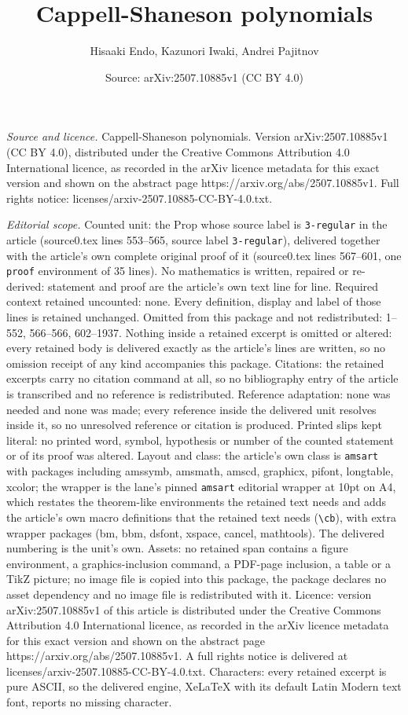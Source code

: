 \documentclass[10pt,a4paper]{amsart}
\title[Cappell-Shaneson polynomials]{Cappell-Shaneson polynomials}
\author{Hisaaki Endo, Kazunori Iwaki, Andrei Pajitnov}
\date{Source: arXiv:2507.10885v1 (CC BY 4.0)}
\begin{document}
\maketitle

\noindent\emph{Source and licence.} Cappell-Shaneson polynomials. Version arXiv:2507.10885v1 (CC BY 4.0), distributed under the Creative Commons Attribution 4.0 International licence, as recorded in the arXiv licence metadata for this exact version and shown on the abstract page https://arxiv.org/abs/2507.10885v1. Full rights notice: licenses/arxiv-2507.10885-CC-BY-4.0.txt.\par\smallskip

\noindent\textit{Editorial scope.} Counted unit: the Prop whose source label is \texttt{3-regular} in the article (source0.tex lines 553--565, source label \texttt{3-regular}), delivered together with the article's own complete original proof of it (source0.tex lines 567--601, one \texttt{proof} environment of 35 lines). No mathematics is written, repaired or re-derived: statement and proof are the article's own text line for line. Required context retained uncounted: none. Every definition, display and label of those lines is retained unchanged. Omitted from this package and not redistributed: 1--552, 566--566, 602--1937. Nothing inside a retained excerpt is omitted or altered: every retained body is delivered exactly as the article's lines are written, so no omission receipt of any kind accompanies this package. Citations: the retained excerpts carry no citation command at all, so no bibliography entry of the article is transcribed and no reference is redistributed. Reference adaptation: none was needed and none was made; every reference inside the delivered unit resolves inside it, so no unresolved reference or citation is produced. Printed slips kept literal: no printed word, symbol, hypothesis or number of the counted statement or of its proof was altered. Layout and class: the article's own class is \texttt{amsart} with packages including amssymb, amsmath, amscd, graphicx, pifont, longtable, xcolor; the wrapper is the lane's pinned \texttt{amsart} editorial wrapper at 10pt on A4, which restates the theorem-like environments the retained text needs and adds the article's own macro definitions that the retained text needs (\texttt{\textbackslash cb}), with extra wrapper packages (bm, bbm, dsfont, xspace, cancel, mathtools). The delivered numbering is the unit's own. Assets: no retained span contains a figure environment, a graphics-inclusion command, a PDF-page inclusion, a table or a TikZ picture; no image file is copied into this package, the package declares no asset dependency and no image file is redistributed with it. Licence: version arXiv:2507.10885v1 of this article is distributed under the Creative Commons Attribution 4.0 International licence, as recorded in the arXiv licence metadata for this exact version and shown on the abstract page https://arxiv.org/abs/2507.10885v1. A full rights notice is delivered at licenses/arxiv-2507.10885-CC-BY-4.0.txt. Characters: every retained excerpt is pure ASCII, so the delivered engine, XeLaTeX with its default Latin Modern text font, reports no missing character.
\end{document}
